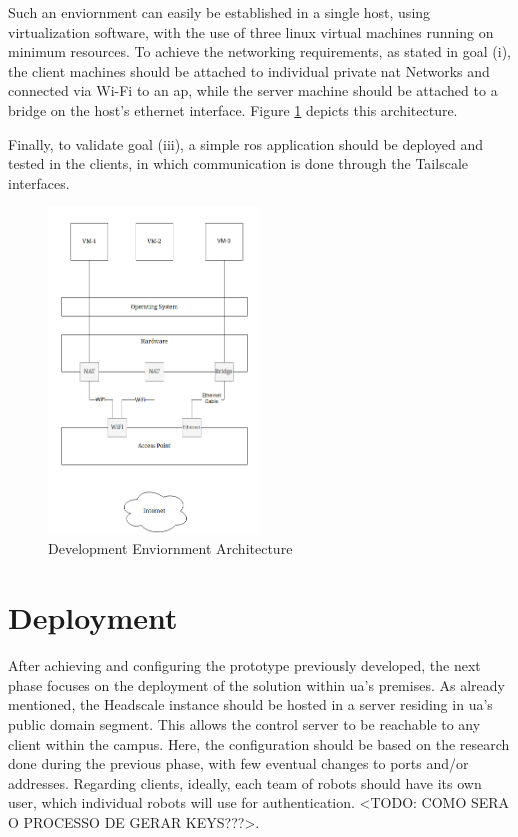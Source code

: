 \documentclass[11pt,twoside,a4paper]{report}
\begin{document}
Such an enviornment can easily be established in a single host, using virtualization software, with the use of three linux virtual machines running on minimum resources. To achieve the networking requirements, as stated in goal (i), the client machines should be attached to individual private \ac{nat} Networks and connected via Wi-Fi to an \ac{ap}, while the server machine should be attached to a bridge on the host's ethernet interface. Figure \ref{fig:sandbox} depicts this architecture.

Finally, to validate goal (iii), a simple \ac{ros} application should be deployed and tested in the clients, in which communication is done through the Tailscale interfaces.

\begin{figure}[h]
\centering
\includegraphics[width=0.5\textwidth]{dev.png}
\caption{Development Enviornment Architecture}
\label{fig:sandbox}
\end{figure}


\section{Deployment}

After achieving and configuring the prototype previously developed, the next phase focuses on the deployment of the solution within \ac{ua}'s premises. As already mentioned, the Headscale instance should be hosted in a server residing in \ac{ua}'s public domain segment. This allows the control server to be reachable to any client within the campus. Here, the configuration should be based on the research done during the previous phase, with few eventual changes to ports and/or addresses. Regarding clients, ideally, each team of robots should have its own user, which individual robots will use for authentication. <TODO: COMO SERA O PROCESSO DE GERAR KEYS???>.
\end{document}
